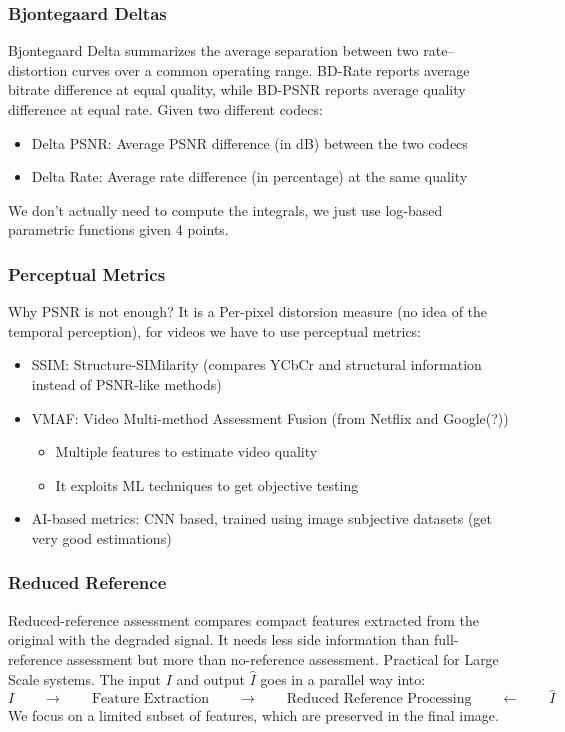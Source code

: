 \subsubsection{Bjontegaard Deltas}
Bjontegaard Delta summarizes the average separation between two rate--distortion curves over a common operating range. BD-Rate reports average bitrate difference at equal quality, while BD-PSNR reports average quality difference at equal rate.
Given two different codecs:
\begin{itemize}
    \item Delta PSNR: Average PSNR difference (in dB) between the two codecs
    \item Delta Rate: Average rate difference (in percentage) at the same quality 
\end{itemize}
We don't actually need to compute the integrals, we just use log-based parametric functions given 4 points.
\subsubsection{Perceptual Metrics}
Why PSNR is not enough? It is a Per-pixel distorsion measure (no idea of the temporal perception), for videos we have to use perceptual metrics:
\begin{itemize}
    \item SSIM: Structure-SIMilarity (compares YCbCr and structural information instead of PSNR-like methods)
    \item VMAF: Video Multi-method Assessment Fusion (from Netflix and Google(?))
    \begin{itemize}
        \item Multiple features to estimate video quality
        \item It exploits ML techniques to get objective testing
    \end{itemize}
    \item AI-based metrics: CNN based, trained using image subjective datasets (get very good estimations)
\end{itemize}
\subsubsection{Reduced Reference}
Reduced-reference assessment compares compact features extracted from the original with the degraded signal. It needs less side information than full-reference assessment but more than no-reference assessment.
Practical for Large Scale systems. The input $I$ and output $\hat{I}$ goes in a parallel way into:
$$\boxed{I} \qquad \longrightarrow \qquad \boxed{\text{Feature Extraction}}\qquad \longrightarrow \qquad \boxed{\text{Reduced Reference Processing}}\qquad \longleftarrow \qquad \boxed{\hat{I}}$$
We focus on a limited subset of features, which are preserved in the final image.
